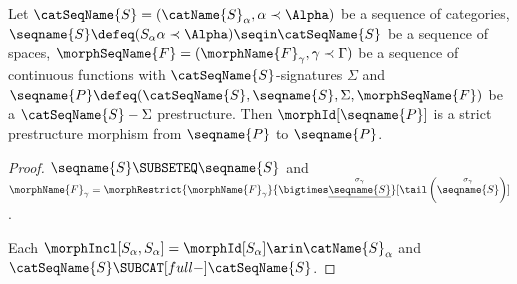 \documentclass{article}
\begin{document}
\begin{corollary}
\label{cor:premorph}
Let $\catSeqName{S}=(\catName{S}_\alpha, \alpha \prec \Alpha)$
be a sequence of categories,
$
  \seqname{S} \defeq (S_\alpha \alpha \prec \Alpha)
  \seqin \catSeqName{S}
$
be a sequence of spaces,
$\morphSeqName{F}=(\morphName{F}_\gamma, \gamma \prec \Gamma)$
be a sequence of continuous functions with $\catSeqName{S}$-signatures
$\Sigma$ and
$
  \seqname{P} \defeq
  (\catSeqName{S}, \seqname{S}, \Sigma, \morphSeqName{F})
$
be a $\catSeqName{S}-\Sigma$ prestructure. Then $\morphId[{\seqname{P}}]$ is a
strict prestructure morphism from $\seqname{P}$ to $\seqname{P}$.

\begin{proof}
$\seqname{S} \SUBSETEQ \seqname{S}$ and
$
  \morphName{F}_\gamma =
  \morphRestrict{\morphName{F}_\gamma}{\bigtimes \underline{\overset{\sigma_\gamma}{\seqname{S}}}}[\tail \left ( \overset{\sigma_\gamma}{\seqname{S}} \right )]
$.

Each
$\morphIncl[{S_\alpha},{S_\alpha}] = \morphId[{S_\alpha}] \arin \catName{S}_\alpha$ and
$\catSeqName{S} \SUBCAT[full-] \catSeqName{S}$.
\end{proof}
\end{corollary}
\end{document}
